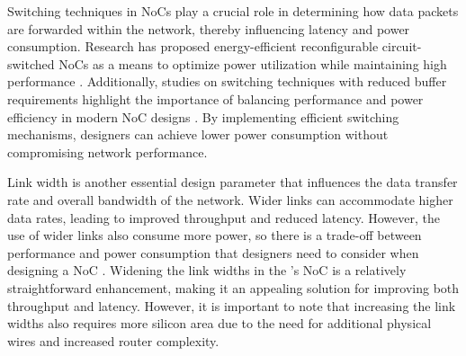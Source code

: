 
Switching techniques in NoCs play a crucial role in determining how data packets are forwarded within the network, thereby influencing latency and power consumption.
Research has proposed energy-efficient reconfigurable circuit-switched NoCs as a means to optimize power utilization while maintaining high performance \cite{wolkotteEnergyEfficientReconfigurableCircuitSwitched2005}.
Additionally, studies on switching techniques with reduced buffer requirements highlight the importance of balancing performance and power efficiency in modern NoC designs \cite{requenaEfficientSwitchingTechnique2008}.
By implementing efficient switching mechanisms, designers can achieve lower power consumption without compromising network performance.

Link width is another essential design parameter that influences the data transfer rate and overall bandwidth of the network.
Wider links can accommodate higher data rates, leading to improved throughput and reduced latency.
However, the use of wider links also consume more power, so there is a trade-off between performance and power consumption that designers need to consider when designing a NoC \cite{manhokimNetworkonchipLinkAnalysis2006}.
Widening the link widths in the \graicore{}'s NoC is a relatively straightforward enhancement, making it an appealing solution for improving both throughput and latency.
However, it is important to note that increasing the link widths also requires more silicon area due to the need for additional physical wires and increased router complexity.


